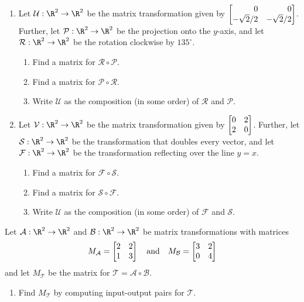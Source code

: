 \begin{exercises}
	\begin{problist}
		\prob 
		\begin{enumerate}
			\item Let $\mathcal U:\R^{2}\to\R^{2}$ be the matrix transformation
				given by $\mat{0&0\\-\sqrt{2}/2 & -\sqrt{2}/2}$.
				Further, let $\mathcal P:\R^{2}\to\R^{2}$ be the
				projection onto the $y$-axis, and let $\mathcal R:\R^{2}\to\R^{2}$
				be the rotation clockwise by $135^{\circ}$.
				\begin{enumerate}
					\item Find a matrix for $\mathcal R \circ \mathcal P$.

					\item Find a matrix for $\mathcal P \circ \mathcal R$.

					\item Write $\mathcal U$ as the composition
						(in some order) of $\mathcal R$ and
						$\mathcal P$.
				\end{enumerate}

			\item Let $\mathcal V:\R^{2}\to\R^{2}$ be the matrix transformation
				given by $\mat{0&2\\2&0}$.
				Further, let $\mathcal S:\R^{2}\to\R^{2}$ be the
				transformation that doubles every vector, and let
				$\mathcal F:\R^{2}\to\R^{2}$ be the
				transformation reflecting over the line $y=x$.
				\begin{enumerate}
					\item Find a matrix for $\mathcal F \circ \mathcal S$.

					\item Find a matrix for $\mathcal S \circ \mathcal F$.

					\item Write $\mathcal U$ as the composition
						(in some order) of $\mathcal F$ and
						$\mathcal S$.
				\end{enumerate}
		\end{enumerate}

		\prob Let $\mathcal A: \R^{2} \to \R^{2}$ and
		$\mathcal B: \R^{2} \to \R^{2}$ be matrix transformations with
		matrices
		\[
			M_{\mathcal A}= \mat{2&2\\1&3}\quad \text{and} \quad M_{\mathcal
			B}= \mat{3&2\\0&4}
		\]
		 and let $M_{\mathcal T}$ be the matrix for $\mathcal T=\mathcal A\circ\mathcal B$.
		\begin{enumerate}
			\item Find $M_{\mathcal T}$ by computing input-output pairs for $\mathcal
				T$.


\end{enumerate}
\end{problist}
\end{exercises}
